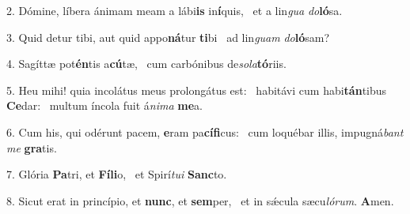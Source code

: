 2. Dómine, líbera ánimam meam a lábi\textbf{is} in\textbf{í}quis, \ast\  et a lin\textit{gua} \textit{do}\textbf{ló}sa.\

3. Quid detur tibi, aut quid appo\textbf{ná}tur \textbf{ti}bi \ast\  ad lin\textit{guam} \textit{do}\textbf{ló}sam?\

4. Sagíttæ pot\textbf{én}tis a\textbf{cú}tæ, \ast\  cum carbónibus de\textit{so}\textit{la}\textbf{tó}riis.\

5. Heu mihi! quia incolátus meus prolongátus est: \dag\  habitávi cum habi\textbf{tán}tibus \textbf{Ce}dar: \ast\  multum íncola fuit á\textit{ni}\textit{ma} \textbf{me}a.\

6. Cum his, qui odérunt pacem, \textbf{e}ram pa\textbf{cí}\textbf{fi}cus: \ast\  cum loquébar illis, impugná\textit{bant} \textit{me} \textbf{gra}tis.\

7. Glória \textbf{Pa}tri, et \textbf{Fí}\textbf{li}o, \ast\  et Spirí\textit{tu}\textit{i} \textbf{Sanc}to.\

8. Sicut erat in princípio, et \textbf{nunc}, et \textbf{sem}per, \ast\  et in sǽcula sæcu\textit{ló}\textit{rum}. \textbf{A}men.\


